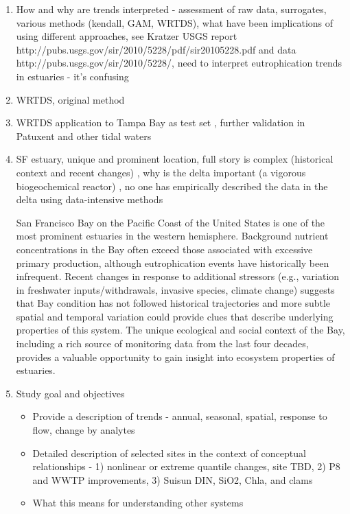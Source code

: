 \documentclass[letterpaper,12pt,oneside]{article}\usepackage[]{graphicx}\usepackage[]{color}
\begin{document}
\begin{enumerate}
\item How and why are trends interpreted - assessment of raw data, surrogates, various methods (kendall, GAM, WRTDS), what have been implications of using different approaches, see Kratzer USGS report http://pubs.usgs.gov/sir/2010/5228/pdf/sir20105228.pdf and data http://pubs.usgs.gov/sir/2010/5228/, need to interpret eutrophication trends in estuaries - it's confusing \citep{Cloern10}
\item WRTDS, original method \citep{Hirsch10,Hirsch15}
\item WRTDS application to Tampa Bay as test set \citep{Beck15}, further validation in Patuxent and other tidal waters \cite{Beck15b}
\item SF estuary, unique and prominent location, full story is complex (historical context and recent changes) \citep{Cloern12b}, why is the delta important (a vigorous biogeochemical reactor) \citep{Jassby00,Jassby02,Jassby08}, no one has empirically described the data in the delta using data-intensive methods

San Francisco Bay on the Pacific Coast of the United States is one of the most prominent estuaries in the western hemisphere.  Background nutrient concentrations in the Bay often exceed those associated with excessive primary production, although eutrophication events have historically been infrequent.  Recent changes in response to additional stressors (e.g., variation in freshwater inputs/withdrawals, invasive species, climate change) suggests that Bay condition has not followed historical trajectories and more subtle spatial and temporal variation could provide clues that describe underlying properties of this system.  The unique ecological and social context of the Bay, including a rich source of monitoring data from the last four decades, provides a valuable opportunity to gain insight into ecosystem properties of estuaries. 

\item Study goal and objectives
\begin{itemize}
\item Provide a description of trends - annual, seasonal, spatial, response to flow, change by analytes
\item Detailed description of selected sites in the context of conceptual relationships - 1) nonlinear or extreme quantile changes, site TBD, 2) P8 and WWTP improvements, 3) Suisun DIN, SiO2, Chla, and clams
\item What this means for understanding other systems
\end{itemize}
\end{enumerate}
\end{document}

